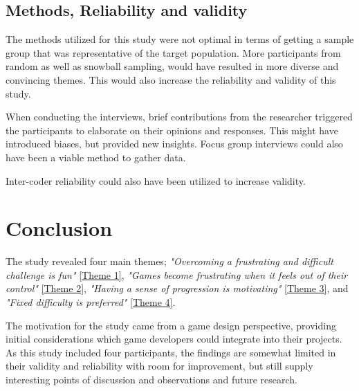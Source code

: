 \subsection{Methods, Reliability and validity}

The methods utilized for this study were not optimal in terms of getting a sample group that was representative of the target population. More participants from random as well as snowball sampling, would have resulted in more diverse and convincing themes. This would also increase the reliability and validity of this study.

When conducting the interviews, brief contributions from the researcher triggered the participants to elaborate on their opinions and responses. This might have introduced biases, but provided new insights. Focus group interviews could also have been a viable method to gather data. 


Inter-coder reliability could also have been utilized to increase validity.

\clearpage

\section{Conclusion}
The study revealed four main themes; \textit{"Overcoming a frustrating and difficult challenge is fun"} \ref{Theme 1}, \textit{"Games become frustrating when it feels out of their control"} \ref{Theme 2}, \textit{"Having a sense of progression is motivating"} \ref{Theme 3}, and \textit{"Fixed difficulty is preferred"} \ref{Theme 4}.

The motivation for the study came from a game design perspective, providing initial considerations which game developers could integrate into their projects. As this study included four participants, the findings are somewhat limited in their validity and reliability with room for improvement, but still supply interesting points of discussion and observations and future research.

